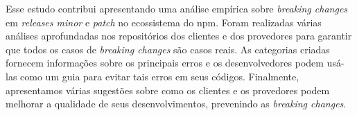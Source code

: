 Esse estudo contribui apresentando uma análise empírica sobre \textit{breaking changes} em \textit{releases minor} e \textit{patch} no ecossistema do \textsf{npm}. Foram realizadas várias análises aprofundadas nos repositórios dos clientes e dos provedores para garantir que todos os casos de \textit{breaking changes} são casos reais. As categorias criadas fornecem informações sobre os principais erros e os desenvolvedores podem usá-las como um guia para evitar tais erros em seus códigos. Finalmente, apresentamos várias sugestões sobre como os clientes e os provedores podem melhorar a qualidade de seus desenvolvimentos, prevenindo as \textit{breaking changes}.